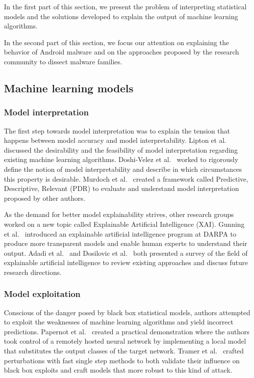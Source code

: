 In the first part of this section, we present the problem of interpreting statistical models and the solutions developed to explain the output of machine learning algorithms.

In the second part of this section, we focus our attention on explaining the behavior of Android malware and on the approaches proposed by the research community to dissect malware families.
\subsection{Machine learning models}
\subsubsection{Model interpretation}
The first step towards model interpretation was to explain the tension that happens between model accuracy and model interpretability.
Lipton et al.~\cite{lipton_mythos_2018} discussed the desirability and the feasibility of model interpretation regarding existing machine learning algorithms.
Doshi-Velez et al.~\cite{doshi-velez_towards_2017} worked to rigorously define the notion of model interpretability and describe in which circumstances this property is desirable.
Murdoch et al.~\cite{murdoch_interpretable_2019} created a framework called Predictive, Descriptive, Relevant (PDR) to evaluate and understand model interpretation proposed by other authors.

As the demand for better model explainability strives, other research groups worked on a new topic called Explainable Artificial Intelligence (XAI).
Gunning et al.~\cite{gunning_explainable_2017} introduced an explainable artificial intelligence program at DARPA to produce more transparent models and enable human experts to understand their output.
Adadi et al.~\cite{adadi_peeking_2018} and Dosilovic et al.~\cite{dosilovic_explainable_2018} both presented a survey of the field of explainable artificial intelligence to review existing approaches and discuss future research directions.
\subsubsection{Model exploitation}
Conscious of the danger posed by black box statistical models, authors attempted to exploit the weaknesses of machine learning algorithms and yield incorrect predictions.
Papernot et al.~\cite{papernot_practical_2016} created a practical demonstration where the authors took control of a remotely hosted neural network by implementing a local model that substitutes the output classes of the target network.
Tramer et al.~\cite{tramer_ensemble_2017} crafted perturbations with fast single step methods to both validate their influence on black box exploits and craft models that more robust to this kind of attack.

